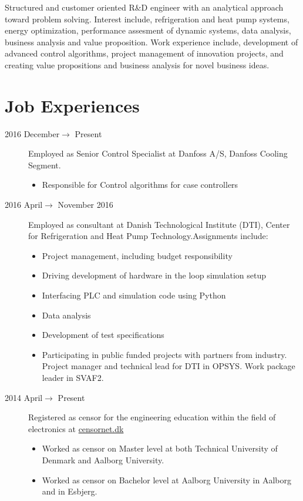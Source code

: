 \documentclass[margin,line,a4paper]{resume}
\begin{document}
\begin{resume}
Structured and customer oriented R\&D engineer with an analytical approach toward problem solving. Interest include, refrigeration and heat pump systems, energy optimization, performance assesment of dynamic systems, data analysis, business analysis and value proposition. Work experience include, development of advanced control algorithms, project management of innovation projects, and creating value propositions and business analysis for novel business ideas.


\section{\mysidestyle Job Experiences}\vspace{1mm}
\begin{description}
\item[2016 December$\rightarrow$ Present] Employed as Senior Control Specialist at Danfoss A/S, Danfoss Cooling Segment.
  \begin{itemize}
  \item Responsible for Control algorithms for case controllers
  \end{itemize}
\item[2016 April$\rightarrow$ November 2016] Employed as consultant at Danish Technological Institute (DTI), Center for Refrigeration and Heat Pump Technology.Assignments include:
\begin{itemize}
\item Project management, including budget responsibility  
\item Driving development of hardware in the loop simulation setup
\item Interfacing PLC and simulation code using Python
\item Data analysis
\item Development of test specifications
\item Participating in public funded projects with partners from industry. Project manager and technical lead for DTI in OPSYS. Work package leader in SVAF2.
\end{itemize}
   \item[2014 April$\rightarrow$ Present] Registered as censor for the engineering education within the field of electronics at \href{https://www.censornet.dk/welcome.htm}{censornet.dk}
     \begin{itemize}
     \item Worked as censor on Master level at both Technical University of Denmark and Aalborg University.
     \item Worked as censor on Bachelor level at Aalborg University in Aalborg and in Esbjerg.
     \end{itemize}


\end{description}
\end{resume}
\end{document}
